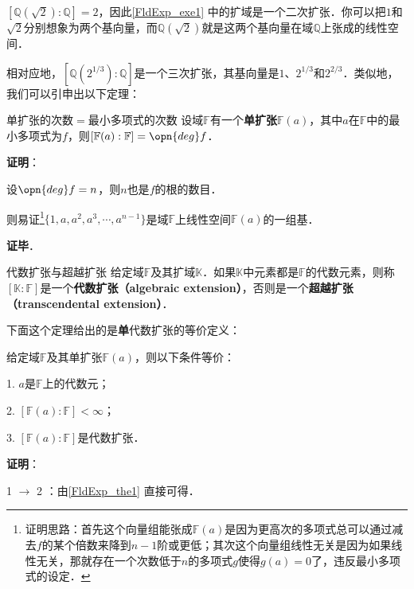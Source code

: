 $[\mathbb{Q}(\sqrt{2}):\mathbb{Q}]=2$，因此\autoref{FldExp_exe1} 中的扩域是一个二次扩张．你可以把$1$和$\sqrt{2}$分别想象为两个基向量，而$\mathbb{Q}(\sqrt{2})$就是这两个基向量在域$\mathbb{Q}$上张成的线性空间．

相对应地，$[\mathbb{Q}(2^{1/3}):\mathbb{Q}]$是一个三次扩张，其基向量是$1$、$2^{1/3}$和$2^{2/3}$．类似地，我们可以引申出以下定理：




\begin{theorem}{单扩张的次数$=$最小多项式的次数}\label{FldExp_the1}
设域$\mathbb{F}$有一个\textbf{单扩张}$\mathbb{F}(a)$，其中$a$在$\mathbb{F}$中的最小多项式为$f$，则$[\mathbb{F}(a):\mathbb{F}]=\opn{deg}f$．
\end{theorem}

\textbf{证明}：

设$\opn{deg}f=n$，则$n$也是$f$的根的数目．

则易证\footnote{证明思路：首先这个向量组能张成$\mathbb{F}(a)$是因为更高次的多项式总可以通过减去$f$的某个倍数来降到$n-1$阶或更低；其次这个向量组线性无关是因为如果线性无关，那就存在一个次数低于$n$的多项式$g$使得$g(a)=0$了，违反最小多项式的设定．}$\{1, a, a^2, a^3, \cdots, a^{n-1}\}$是域$\mathbb{F}$上线性空间$\mathbb{F}(a)$的一组基．

\textbf{证毕}．




\begin{definition}{代数扩张与超越扩张}\label{FldExp_def5}\label{FldExp_def4}\label{FldExp_def3}
给定域$\mathbb{F}$及其扩域$\mathbb{K}$．如果$\mathbb{K}$中元素都是$\mathbb{F}$的代数元素，则称$[\mathbb{K}:\mathbb{F}]$是一个\textbf{代数扩张（algebraic extension）}，否则是一个\textbf{超越扩张（transcendental extension）}．
\end{definition}

下面这个定理给出的是\textbf{单}代数扩张的等价定义：

\begin{theorem}{}\label{FldExp_the2}
给定域$\mathbb{F}$及其单扩张$\mathbb{F}(a)$，则以下条件等价：

1. $a$是$\mathbb{F}$上的代数元；

2. $[\mathbb{F}(a):\mathbb{F}]<\infty$；

3. $[\mathbb{F}(a):\mathbb{F}]$是代数扩张．

\end{theorem}


\textbf{证明}：

1 $\to$ 2 ：由\autoref{FldExp_the1} 直接可得．

